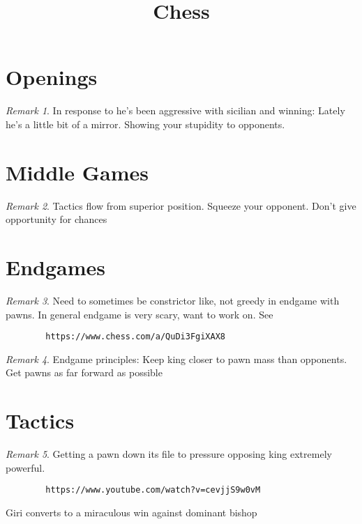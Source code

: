 \documentclass[11pt]{article}
\title{Chess}
\theoremstyle{remark}
\newtheorem{remark}{Remark}
\begin{document}
\maketitle

\section{Openings}

\begin{remark}
	In response to he's been aggressive with sicilian and winning: Lately he's a little bit of a mirror. Showing your stupidity to opponents.
\end{remark}

\section{Middle Games}

\begin{remark}
	Tactics flow from superior position. Squeeze your opponent. Don't give opportunity for chances
\end{remark}

\section{Endgames}

\begin{remark}
	Need to sometimes be constrictor like, not greedy in endgame with pawns. In general endgame is very scary, want to work on. See
	\begin{verbatim}
		https://www.chess.com/a/QuDi3FgiXAX8
	\end{verbatim}
\end{remark}

\begin{remark}
	Endgame principles: Keep king closer to pawn mass than opponents. Get pawns as far forward as possible
\end{remark}

\section{Tactics}

\begin{remark}
	Getting a pawn down its file to pressure opposing king extremely powerful. 
	\begin{verbatim}
		https://www.youtube.com/watch?v=cevjjS9w0vM
	\end{verbatim}
	Giri converts to a miraculous win against dominant bishop
\end{remark}
\end{document}
